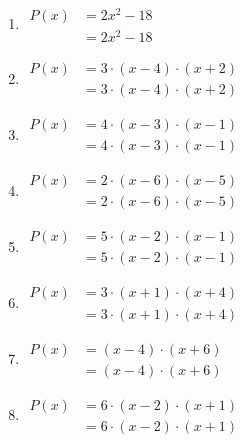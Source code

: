 \documentclass[11pt,a4paper]{article}
\begin{document}
\begin{enumerate}[label={},itemsep=9pt]
\item[\textbf{C023}] \(\displaystyle \begin{aligned}P(x)&=2x^{2} - 18\\ &= 2x^{2} - 18\end{aligned}\)\par
\item[\textbf{C024}] \(\displaystyle \begin{aligned}P(x)&=3 \cdot \left(x - 4\right) \cdot \left(x + 2\right)\\ &= 3 \cdot \left(x - 4\right) \cdot \left(x + 2\right)\end{aligned}\)\par
\item[\textbf{C025}] \(\displaystyle \begin{aligned}P(x)&=4 \cdot \left(x - 3\right) \cdot \left(x - 1\right)\\ &= 4 \cdot \left(x - 3\right) \cdot \left(x - 1\right)\end{aligned}\)\par
\item[\textbf{C026}] \(\displaystyle \begin{aligned}P(x)&=2 \cdot \left(x - 6\right) \cdot \left(x - 5\right)\\ &= 2 \cdot \left(x - 6\right) \cdot \left(x - 5\right)\end{aligned}\)\par
\item[\textbf{C027}] \(\displaystyle \begin{aligned}P(x)&=5 \cdot \left(x - 2\right) \cdot \left(x - 1\right)\\ &= 5 \cdot \left(x - 2\right) \cdot \left(x - 1\right)\end{aligned}\)\par
\item[\textbf{C028}] \(\displaystyle \begin{aligned}P(x)&=3 \cdot \left(x + 1\right) \cdot \left(x + 4\right)\\ &= 3 \cdot \left(x + 1\right) \cdot \left(x + 4\right)\end{aligned}\)\par
\item[\textbf{C029}] \(\displaystyle \begin{aligned}P(x)&=\left(x - 4\right) \cdot \left(x + 6\right)\\ &= \left(x - 4\right) \cdot \left(x + 6\right)\end{aligned}\)\par
\item[\textbf{C030}] \(\displaystyle \begin{aligned}P(x)&=6 \cdot \left(x - 2\right) \cdot \left(x + 1\right)\\ &= 6 \cdot \left(x - 2\right) \cdot \left(x + 1\right)\end{aligned}\)\par
\end{enumerate}
\end{document}
